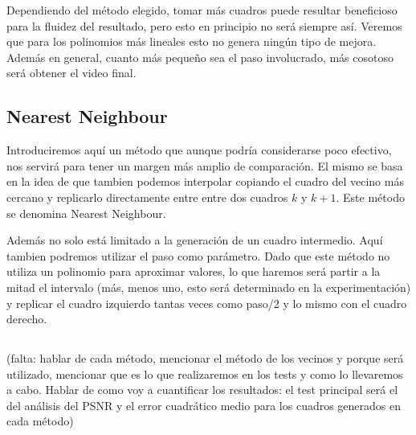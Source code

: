 Dependiendo del método elegido, tomar más cuadros puede resultar beneficioso para la fluidez del resultado, pero esto en principio no será siempre así. Veremos que para los polinomios más lineales esto no genera ningún tipo de mejora. Además en general, cuanto más pequeño sea el paso involucrado, más cosotoso será obtener el video final. 

\subsection{Nearest Neighbour}

Introduciremos aquí un método que aunque podría considerarse poco efectivo, nos servirá para tener un margen más amplio de comparación. El mismo se basa en la idea de que tambien podemos interpolar copiando el cuadro del vecino más cercano y replicarlo directamente entre entre dos cuadros $k$ y $k+1$. Este método se denomina Nearest Neighbour. 

Además no solo está limitado a la generación de un cuadro intermedio. Aquí tambien podremos utilizar el paso como parámetro. Dado que este método no utiliza un polinomio para aproximar valores, lo que haremos será partir a la mitad el intervalo (más, menos uno, esto será determinado en la experimentación) y replicar el cuadro izquierdo tantas veces como paso/2 y lo mismo con el cuadro derecho. 

\subsection{}

(falta: hablar de cada método, mencionar el método de los vecinos y porque será utilizado, mencionar que es lo que realizaremos en los tests y como lo llevaremos a cabo. Hablar de como voy a cuantificar los resultados: el test principal será el del análisis del PSNR y el error cuadrático medio para los cuadros generados en cada método)










